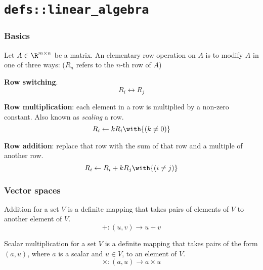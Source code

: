\chapter{\texttt{defs::linear\_algebra}}\label{d146713}

\begin{toc}
\end{toc}

\subsection{Basics}\label{e3e653f}

\label{d7fc6d0}

Let $A\in\R^{m\times n}$ be a matrix. An elementary row operation on $A$ is to
modify $A$ in one of three ways: ($R_n$ refers to the $n$-th row of $A$)
\begin{enumerati}
  \item \textbf{Row switching}.
  $$
    R_i\leftrightarrow R_j
  $$
  \item \textbf{Row multiplication}: each element in a row is multiplied by a
  non-zero constant. Also known as \textit{scaling} a row.
  $$
    R_i\gets kR_i\with{(k\neq0)}
  $$
  \item \textbf{Row addition}: replace that row with the sum of that row and a
  multiple of another row.
  $$
    R_i\gets R_i+kR_j\with{(i\neq j)}
  $$
\end{enumerati}

\subsection{Vector spaces}\label{f8a1623}

\label{bcc80c6}

Addition for a set $V$ is a definite mapping that takes pairs of elements of
$V$ to another element of $V$.
$$
  +:(u,v)\to u+v
$$

\label{ab30b6e}

Scalar multiplication for a set $V$ is a definite mapping that takes pairs of
the form $(a,u)$, where $a$ is a scalar and $u\in V$, to an element of $V$.
$$
  \times:(a,u)\to a\times u
$$

